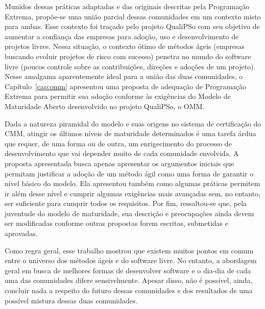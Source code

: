 Munidos dessas práticas adaptadas e das originais descritas pela
Programação Extrema, propõe-se uma união parcial dessas comunidades em
um contexto misto para ambas. Esse contexto foi traçado pelo projeto
QualiPSo com seu objetivo de aumentar a confiança das empresas para
adoção, uso e desenvolvimento de projetos livres.  Nessa situação, o
contexto ótimo de métodos ágeis (empresas buscando evoluir projetos de
risco com sucesso) penetra no mundo do software livre (poucos controle
sobre as contribuições, direções e adoções de um projeto). Nesse
amalgama aparentemente ideal para a união das duas comunidades, o
Capítulo~\ref{cap:omm} apresentou uma proposta de adequação de
Programação Extrema para permitir sua adoção conforme às exigências do
Modelo de Maturidade Aberto desenvolvido no projeto QualiPSo, o OMM.

Dada a natureza piramidal do modelo e suas origens no sistema de
certificação do CMM, atingir os últimos níveis de maturidade
determinados é uma tarefa árdua que requer, de uma forma ou de outra,
um enrigecimento do processo de desenvolvimento que vai depender muito
de cada comunidade envolvida. A proposta apresentada busca apenas
apresentar os argumentos iniciais que permitam justificar a adoção de
um método ágil como uma forma de garantir o nível básico do
modelo. Ela apresentou também como algumas práticas permitem ir além
desse nível e cumprir algumas exigências mais avançadas sem, no
entanto, ser suficiente para cumprir todos os requisitos. Por fim,
ressaltou-se que, pela juventude do modelo de maturidade, sua
descrição e preocupações ainda devem ser modificadas conforme outras
propostas forem escritas, submetidas e aprovadas.

Como regra geral, esse trabalho mostrou que existem muitos pontos em
comum entre o universo dos métodos ágeis e do software livre. No
entanto, a abordagem geral em busca de melhores formas de desenvolver
software e o dia-dia de cada uma das comunidades difere
sensivelmente. Apesar disso, não é possível, ainda, concluir nada a
respeito do futuro dessas comunidades e dos resultados de uma possível
mistura dessas duas comunidades.

